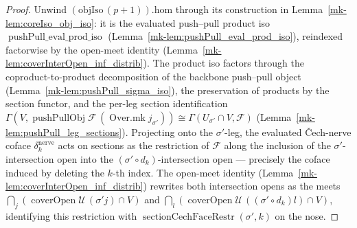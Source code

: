 \begin{proof}
  Unwind \((\mathrm{objIso}\,(p+1)).\mathrm{hom}\) through its construction in
  Lemma~\ref{mk-lem:coreIso_obj_iso}: it is the evaluated push--pull product iso
  \(\operatorname{pushPull\_eval\_prod\_iso}\) (Lemma~\ref{mk-lem:pushPull_eval_prod_iso}),
  reindexed factorwise by the open-meet identity (Lemma~\ref{mk-lem:coverInterOpen_inf_distrib}).
  The product iso factors through the coproduct-to-product decomposition of the backbone
  push--pull object (Lemma~\ref{mk-lem:pushPull_sigma_iso}), the preservation of products by the
  section functor, and the per-leg section identification
  \(\Gamma(V, \operatorname{pushPullObj}\mathcal{F}\,(\operatorname{Over.mk} j_{\sigma'})) \cong
  \Gamma(U_{\sigma'} \cap V, \mathcal{F})\) (Lemma~\ref{mk-lem:pushPull_leg_sections}). Projecting
  onto the \(\sigma'\)-leg, the evaluated {\v C}ech-nerve coface \(\delta^{\mathrm{nerve}}_k\)
  acts on sections as the restriction of \(\mathcal{F}\) along the inclusion of the
  \(\sigma'\)-intersection open into the \((\sigma' \circ d_k)\)-intersection open — precisely the
  coface induced by deleting the \(k\)-th index. The open-meet identity
  (Lemma~\ref{mk-lem:coverInterOpen_inf_distrib}) rewrites both intersection opens as the meets
  \(\bigcap_j(\operatorname{coverOpen}\mathcal{U}\,(\sigma' j) \cap V)\) and
  \(\bigcap_l(\operatorname{coverOpen}\mathcal{U}\,((\sigma' \circ d_k) l) \cap V)\), identifying
  this restriction with \(\operatorname{sectionCechFaceRestr}(\sigma', k)\) on the nose.
\end{proof}

